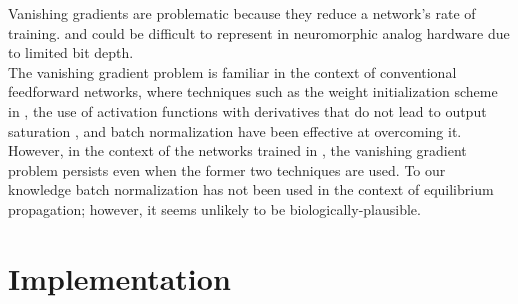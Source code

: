 \documentclass[format=sigconf]{acmart}
\newcommand{\npar}{\\\indent}
\begin{document}
Vanishing gradients are problematic because they reduce a network's rate of training. and could be difficult to represent in neuromorphic analog hardware due to limited bit depth.
\npar
The vanishing gradient problem is familiar in the context of conventional feedforward networks, where techniques such as the weight initialization scheme in \cite{glorot2010}, the use of activation functions with derivatives that do not lead to output saturation \cite{schmidhuber2015}, and batch normalization \cite{ioffe2015} have been effective at overcoming it. However, in the context of the networks trained in \cite{scellier17}, the vanishing gradient problem persists even when the former two techniques are used. To our knowledge batch normalization has not been used in the context of equilibrium propagation; however, it seems unlikely to be biologically-plausible.

\section{Implementation}
\label{sec:implementation}
\end{document}
